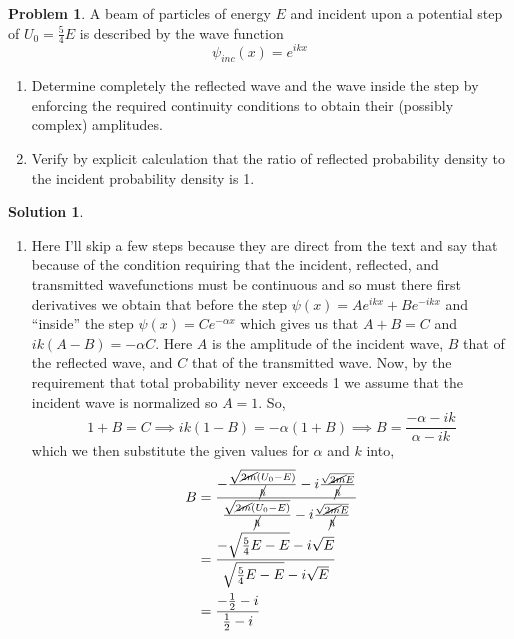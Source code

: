 \documentclass[10pt]{article}
\theoremstyle{definition}
\newtheorem{problem}{Problem}
\newtheorem{soln}{Solution}
\begin{document}
\begin{problem}
A beam of particles of energy $E$ and incident upon a potential step of $U_0 = \frac{5}{4}E$ is described by the wave function
$$\psi_{inc}(x)=e^{ikx}$$
\begin{enumerate}[label=(\alph*)]
  \item Determine completely the reflected wave and the
        wave inside the step by enforcing the required
        continuity conditions to obtain their (possibly
        complex) amplitudes.
  \item Verify by explicit calculation that the ratio of
        reflected probability density to the incident probability density is 1.
\end{enumerate}
\end{problem}
\begin{soln}~
  \begin{enumerate}[label=(\alph*)]
    \item Here I'll skip a few steps because they are direct from the text and say that because of the condition requiring that the incident, reflected, and transmitted wavefunctions
          must be continuous and so must there first derivatives we obtain that before the step $\psi(x)=Ae^{ikx}+Be^{-ikx}$ and ``inside'' the step $\psi(x)=Ce^{-\alpha x}$ which gives us that
          $A+B=C$ and $ik(A-B)=-\alpha C$. Here $A$ is the amplitude of the incident wave, $B$ that of the reflected wave, and $C$ that of the transmitted wave. Now, by the requirement that
          total probability never exceeds 1 we assume that the incident wave is normalized so $A=1$. So,
          $$1+B=C\implies ik(1-B)=-\alpha \left(1+B\right)\implies B=\frac{-\alpha-ik}{\alpha-ik}$$
          which we then substitute the given values for $\alpha$ and $k$ into,
          \begin{align*}
            B & =\frac{-\frac{\sqrt{\cancel{2m}\left(U_0-E\right)}}{\cancel{\hbar}}-i\frac{\sqrt{\cancel{2m}E}}{\cancel{\hbar}}}{\frac{\sqrt{\cancel{2m}\left(U_0-E\right)}}{\cancel{\hbar}}-i\frac{\sqrt{\cancel{2m}E}}{\cancel{\hbar}}} \\
              & =\frac{-\sqrt{\frac{5}{4}E-E}-i\sqrt{E}}{\sqrt{\frac{5}{4}E-E}-i\sqrt{E}}                                                                                                                                                 \\
              & =\frac{-\frac{1}{2}-i}{\frac{1}{2}-i}                                                                                                                                                                                     \\

\end{align*}
\end{enumerate}
\end{soln}
\end{document}

